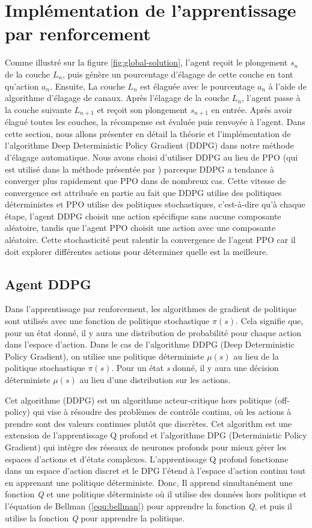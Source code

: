\section{Implémentation de l’apprentissage par renforcement}
Comme illustré sur la figure \ref{fig:global-solution}, l'agent reçoit le plongement $s_n$ de la couche $L_n$, puis génère un pourcentage d'élagage de cette couche en tant qu'action $a_n$. Ensuite, La couche $L_n$ est élaguée avec le pourcentage $a_n$ à l'aide de algorithme d'élagage de canaux. Après l'élagage de la couche $L_n$, l'agent passe à la couche suivante $L_{n+1}$ et reçoit son plongement $s_{n+1}$ en entrée. Après avoir élagué toutes les couches, la récompense est évaluée puis renvoyée à l'agent. Dans cette section, nous allons présenter en détail la théorie et l'implémentation de l'algorithme Deep Deterministic Policy Gradient (DDPG) dans notre méthode d'élagage automatique. Nous avons choisi d'utiliser DDPG au lieu de PPO (qui est utilisé dans la méthode présentée par \cite{pfe2022}) parceque DDPG a tendance à converger plus rapidement que PPO dans de nombreux cas. Cette vitesse de convergence est attribuée en partie au fait que DDPG utilise des politiques déterministes et PPO utilise des politiques stochastiques, c'est-à-dire qu'à chaque étape, l'agent DDPG choisit une action spécifique sans aucune composante aléatoire, tandis que l'agent PPO choisit une action avec une composante aléatoire. Cette stochasticité peut ralentir la convergence de l'agent PPO car il doit explorer différentes actions pour déterminer quelle est la meilleure.


\subsection{Agent DDPG}
Dans l'apprentissage par renforcement, les algorithmes de gradient de politique sont utilisés avec une fonction de politique stochastique $\pi(s)$. Cela signifie que, pour un état donné, il y aura une distribution de probabilité pour chaque action dans l’espace d’action. Dans le cas de l'algorithme DDPG (Deep Deterministic Policy Gradient), on utilise une politique déterministe $\mu(s)$ au lieu de la politique stochastique $\pi(s)$. Pour un état \textit{s} donné, il y aura une décision déterministe $\mu(s)$ au lieu d'une distribution sur les actions.

Cet algorithme (DDPG) est un algorithme acteur-critique hors politique (off-policy) qui vise à résoudre des problèmes de contrôle continu, où les actions à prendre sont des valeurs continues plutôt que discrètes. Cet algorithm est une extension de l'apprentissage Q profond et l'algorithme DPG (Deterministic Policy Gradient) qui intègre des réseaux de neurones profonds pour mieux gérer les espaces d'actions et d'états complexes. L'apprentissage Q profond fonctionne dans un espace d'action discret et le DPG l'étend à l'espace d'action continu tout en apprenant une politique déterministe. Donc, Il apprend simultanément une fonction \textit{Q} et une politique déterministe où il utilise des données hors politique et l'équation de Bellman (\ref{equ:bellman}) pour apprendre la fonction \textit{Q}, et puis il utilise la fonction \textit{Q} pour apprendre la politique.

